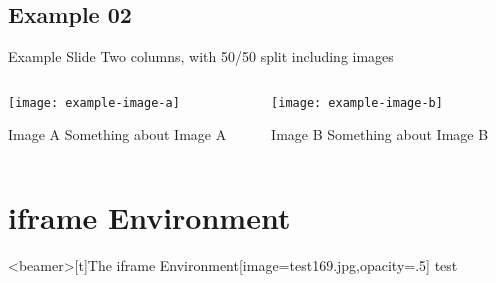 \documentclass[aspectratio=169]{beamer}
\begin{document}
\subsection{Example 02}

\begin{frame}[t]{Example Slide }{Two columns, with 50/50 split including images}

  \begin{columns}[T]
    \begin{column}{.5\textwidth}

      \texttt{[image: example-image-a]}

      \begin{exampleblock}{Image A}
        Something about \alert{Image A}
      \end{exampleblock}

    \end{column}

    \begin{column}{.5\textwidth}

      \texttt{[image: example-image-b]}

      \begin{alertblock}{Image B}
        Something about \alert{Image B}
      \end{alertblock}

    \end{column}
  \end{columns}

\end{frame}


\section{iframe Environment}

\begin{iframe}<beamer>[t]{The iframe Environment}[image=test169.jpg,opacity=.5]
  test
\end{iframe}
\end{document}
